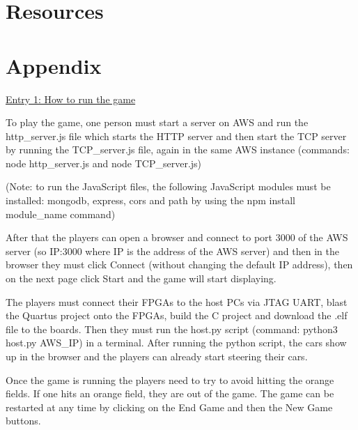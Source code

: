 \documentclass[12pt,a4paper]{article}
\begin{document}
\section{\normalsize Resources}

\section{\normalsize Appendix}

\underline{Entry 1: How to run the game}
\par
To play the game, one person must start a server on AWS and run the http\_server.js 
file which starts the HTTP server and then start the TCP server by running the 
TCP\_server.js file, again in the same AWS instance (commands: 
node http\_server.js and node TCP\_server.js)
\par
(Note: to run the JavaScript files, the following JavaScript modules must be 
installed: mongodb, express, cors and path by using the 
npm install module\_name command)
\par
After that the players can open a browser and connect to port 3000 of the AWS server 
(so IP:3000 where IP is the address of the AWS server) and then in the browser they 
must click Connect (without changing the default IP address), then on the next page 
click Start and the game will start displaying.
\par
The players must connect their FPGAs to the host PCs via JTAG UART, blast the Quartus 
project onto the FPGAs, build the C project and download the .elf file to the boards. 
Then they must run the host.py script (command: python3 host.py {AWS\_IP}) in a 
terminal. After running the python script, the cars show up in the browser and the 
players can already start steering their cars.
\par
Once the game is running the players need to try to avoid hitting the orange fields. 
If one hits an orange field, they are out of the game. The game can be restarted at 
any time by clicking on the End Game and then the New Game buttons.
\end{document}
